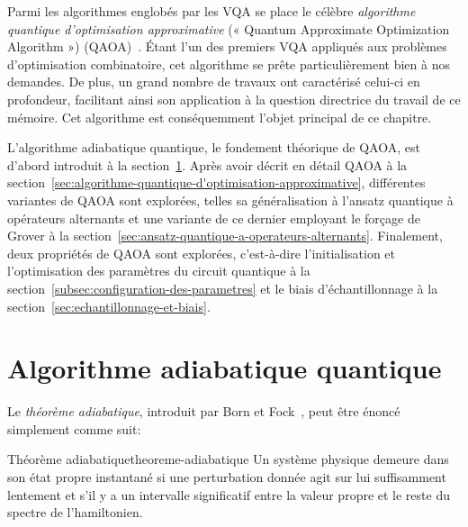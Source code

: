 Parmi les algorithmes englobés par les VQA se place le célèbre \textit{algorithme quantique d'optimisation approximative} (« Quantum Approximate Optimization Algorithm ») (QAOA)~\cite{farhiQuantumApproximateOptimization2014}. Étant l'un des premiers VQA appliqués aux problèmes d'optimisation combinatoire, cet algorithme se prête particulièrement bien à nos demandes. De plus, un grand nombre de travaux ont caractérisé celui-ci en profondeur, facilitant ainsi son application à la question directrice du travail de ce mémoire. Cet algorithme est conséquemment l'objet principal de ce chapitre. 

L'algorithme adiabatique quantique, le fondement théorique de QAOA, est d'abord introduit à la section~\ref{sec:algorithme-adiabatique-quantique}. Après avoir décrit en détail QAOA à la section~\ref{sec:algorithme-quantique-d'optimisation-approximative}, différentes variantes de QAOA sont explorées, telles sa généralisation à l'ansatz quantique à opérateurs alternants et une variante de ce dernier employant le forçage de Grover à la section~\ref{sec:ansatz-quantique-a-operateurs-alternants}. Finalement, deux propriétés de QAOA sont explorées, c'est-à-dire l'initialisation et l'optimisation des paramètres du circuit quantique à la section~\ref{subsec:configuration-des-parametres} et le biais d'échantillonnage à la section~\ref{sec:echantillonnage-et-biais}.


\section{Algorithme adiabatique quantique}
\label{sec:algorithme-adiabatique-quantique}

Le \textit{théorème adiabatique}, introduit par Born et Fock~\cite{bornBeweisAdiabatensatzes1928}, peut être énoncé simplement comme suit:

\begin{subtheorem}{Théorème adiabatique}{theoreme-adiabatique}
    Un système physique demeure dans son état propre instantané si une perturbation donnée agit sur lui suffisamment lentement et s'il y a un intervalle significatif entre la valeur propre et le reste du spectre de l'hamiltonien.
\end{subtheorem}

